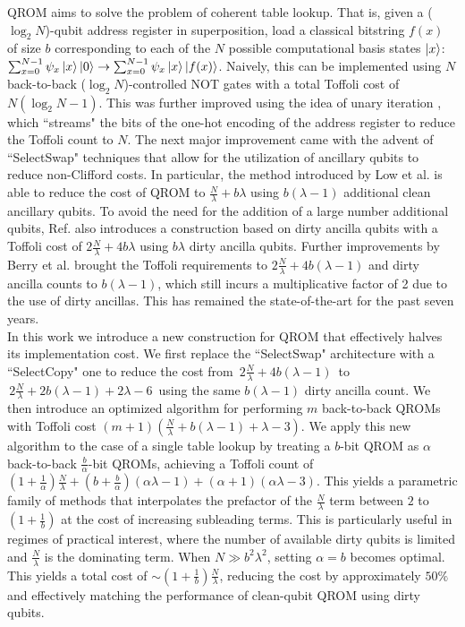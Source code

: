 \documentclass[a4paper, amsfonts, amssymb, amsmath, reprint, showkeys, twoside,superscriptaddress, onecolumn, nofootinbib]{revtex4-2}
\begin{document}
QROM aims to solve the problem of coherent table lookup. That is, given a ($\log_2 N$)-qubit address register in superposition, load a classical bitstring $f(x)$ of size $b$ corresponding to each of the $N$ possible computational basis states $\ket{x}$: $\sum_{x=0}^{N-1} \psi_x \ket{x}\ket{0} \to  \sum_{x=0}^{N-1} \psi_x \ket{x} \ket{f(x)}$. Naively, this can be implemented using $N$ back-to-back ($\log_2 N$)-controlled NOT gates with a total Toffoli cost of $N(\log_2 N - 1)$. This was further improved using the idea of unary iteration \cite{babbush2018encoding}, which ``streams" the bits of the one-hot encoding of the address register to reduce the Toffoli count to $N$. The next major improvement came with the advent of ``SelectSwap" techniques that allow for the utilization of ancillary qubits to reduce non-Clifford costs. In particular, the method introduced by Low et al. \cite{low2024trading} is able to reduce the cost of QROM to $\frac{N}{\lambda} + b\lambda$ using $b(\lambda-1)$ additional clean ancillary qubits. To avoid the need for the addition of a large number additional qubits, Ref. \cite{low2024trading} also introduces a construction based on dirty ancilla qubits with a Toffoli cost of $2\frac{N}{\lambda} + 4b\lambda$ using $b\lambda$ dirty ancilla qubits. Further improvements by Berry et al. \cite{berry2019qubitization} brought the Toffoli requirements to $2\frac{N}{\lambda} + 4b(\lambda - 1)$ and dirty ancilla counts to $b(\lambda-1)$, which still incurs a multiplicative factor of 2 due to the use of dirty ancillas. This has remained the state-of-the-art for the past seven years.\\

In this work we introduce a new construction for QROM that effectively halves its implementation cost. We first replace the ``SelectSwap" architecture with a ``SelectCopy" one to reduce the cost from $\,2\frac{N}{\lambda} + 4b(\lambda - 1)\,$ to $\,2\frac{N}{\lambda} + 2b(\lambda - 1) +2\lambda-6\,$ using the same $b(\lambda-1)$ dirty ancilla count. We then introduce an optimized algorithm for performing $m$ back-to-back QROMs with Toffoli cost $(m+1)\left(\frac{N}{\lambda} + b(\lambda - 1) +\lambda-3\right)$. We apply this new algorithm to the case of a single table lookup by treating a $b$-bit QROM as $\alpha$ back-to-back $\frac{b}{\alpha}$-bit QROMs, achieving a Toffoli count of $(1+\frac{1}{\alpha})\frac{N}{\lambda} + (b+\frac{b}{\alpha})(\alpha\lambda - 1) + (\alpha+1)(\alpha\lambda-3)$. This yields a parametric family of methods that interpolates the prefactor of the $\frac{N}{\lambda} $ term between $2$ to $(1+\frac{1}{b})$ at the cost of increasing subleading terms. This is particularly useful in regimes of practical interest, where the number of available dirty qubits is limited and $\frac{N}{\lambda} $ is the dominating term. When $N \gg b^2 \lambda^2$, setting $\alpha = b$ becomes optimal. This yields a total cost of $\sim (1+\frac{1}{b})\frac{N}{\lambda}$, reducing the cost by approximately $50\%$ and effectively matching the performance of clean-qubit QROM using dirty qubits.\\
\end{document}
